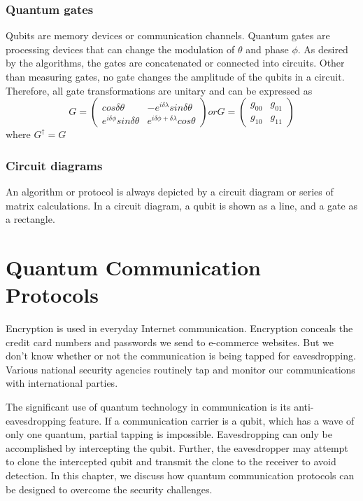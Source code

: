 \documentclass[oneside, letter, 12pt]{book}
\begin{document}
\subsection{Quantum gates}
Qubits are memory devices or communication channels. Quantum gates are processing devices that can change the modulation of $\theta$ and phase $\phi$. As desired by the algorithms, the gates are concatenated or connected into circuits. Other than measuring gates, no gate changes the amplitude of the qubits in a circuit. Therefore, all gate transformations are unitary and can be expressed as
\begin{equation}
G=
    \begin{pmatrix}
        cos\delta \theta & -e^{i\delta \lambda} sin\delta \theta \\
        e^{i \delta \phi} sin\delta \theta & e^{i \delta \phi+ \delta \lambda} cos\theta 
    \end{pmatrix} or
G=   \begin{pmatrix}
        g_{00} & g_{01} \\
        g_{10} & g_{11} 
    \end{pmatrix}
\end{equation}
where $G^\dagger = G$


\subsection{Circuit diagrams}
An algorithm or protocol is always depicted by a circuit diagram or series of matrix calculations. In a circuit diagram, a qubit is shown as a line, and a gate as a rectangle.

\chapter{Quantum Communication Protocols}\label{c-comm}
Encryption is used in everyday Internet communication. Encryption conceals the credit card numbers and passwords we send to e-commerce websites. But we don't know whether or not the communication is being tapped for eavesdropping. Various national security agencies routinely tap and monitor our communications with international parties.

The significant use of quantum technology in communication is its anti-eavesdropping feature. If a communication carrier is a qubit, which has a wave of only one quantum, partial tapping is impossible. Eavesdropping can only be accomplished by intercepting the qubit. Further, the eavesdropper may attempt to clone the intercepted qubit and transmit the clone to the receiver to avoid detection. In this chapter, we discuss how quantum communication protocols can be designed to overcome the security challenges.
\end{document}
